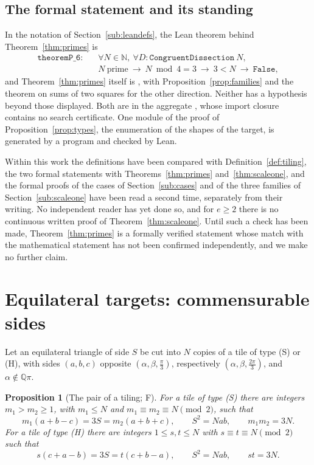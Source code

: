 \documentclass[11pt,reqno]{amsart}
\theoremstyle{plain}
\newtheorem{proposition}[theorem]{Proposition}
\theoremstyle{definition}
\newcommand{\Q}{\mathbb{Q}}
\newcommand{\N}{\mathbb{N}}
\newcommand{\sF}{\textup{\textsf{F}}}
\begin{document}
\subsection{The formal statement and its standing}\label{sub:formalprime}
In the notation of Section~\ref{sub:leandefs}, the Lean theorem behind Theorem~\ref{thm:primes} is
\begin{align*}
\texttt{theoremP\_6}:\quad &\forall N\in\N,\ \forall D:\texttt{CongruentDissection}\ N,\\
&N\ \text{prime}\ \to\ N\bmod4=3\ \to\ 3<N\ \to\ \texttt{False},
\end{align*}
and Theorem~\ref{thm:primes} itself is , with
Proposition~\ref{prop:families} and the theorem on sums of two squares for the other direction. Neither has
a hypothesis beyond those displayed. Both are in the aggregate , whose import closure
contains no search certificate. One module of the proof of Proposition~\ref{prop:types}, the enumeration of
the shapes of the target, is generated by a program and checked by Lean.

Within this work the definitions have been compared with Definition~\ref{def:tiling}, the two formal
statements with Theorems~\ref{thm:primes} and~\ref{thm:scaleone}, and the formal proofs of the cases of
Section~\ref{sub:cases} and of the three families of Section~\ref{sub:scaleone} have been read a second time,
separately from their writing. No independent reader has yet done so, and for $e\ge2$ there is no continuous written proof of Theorem~\ref{thm:scaleone}.
Until such a check has been made, Theorem~\ref{thm:primes} is a formally verified statement whose match with
the mathematical statement has not been confirmed independently, and we make no further claim.

\section{Equilateral targets: commensurable sides}\label{sec:pairs}

Let an equilateral triangle of side $S$ be cut into $N$ copies of a tile of type (S) or (H), with sides
$(a,b,c)$ opposite $(\alpha,\beta,\frac\pi3)$, respectively $(\alpha,\beta,\frac{2\pi}3)$, and
$\alpha\notin\Q\pi$.

\begin{proposition}[The pair of a tiling; \sF]\label{prop:pairs}
For a tile of type \textup{(S)} there are integers $m_1>m_2\ge1$, with $m_1\le N$ and
$m_1\equiv m_2\equiv N\pmod2$, such that
\[
m_1(a+b-c)=3S=m_2(a+b+c),\qquad S^2=Nab,\qquad m_1m_2=3N .
\]
For a tile of type \textup{(H)} there are integers $1\le s,t\le N$ with $s\equiv t\equiv N\pmod2$ such that
\[
s(c+a-b)=3S=t(c+b-a),\qquad S^2=Nab,\qquad st=3N .
\]
\end{proposition}
\end{document}
